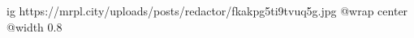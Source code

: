  
 
 
 
 

\ifcmt
  ig https://mrpl.city/uploads/posts/redactor/fkakpg5ti9tvuq5g.jpg
  @wrap center
  @width 0.8
\fi
